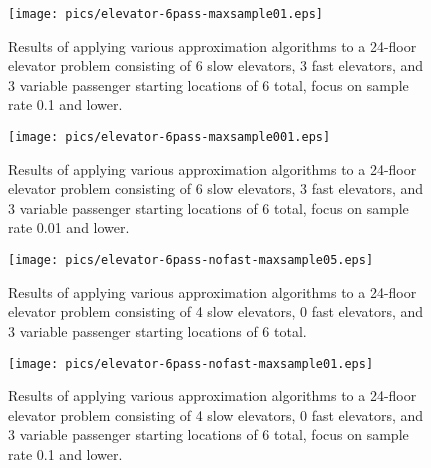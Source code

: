\begin{figure}
\begin{center}
\texttt{[image: pics/elevator-6pass-maxsample01.eps]}
\caption{Results of applying various approximation algorithms to a 24-floor elevator problem consisting of 6 slow elevators, 3 fast elevators, and 3 variable passenger starting locations of 6 total, focus on sample rate 0.1 and lower.}
\label{fig:elevator-6pass-maxsample01}
\end{center}
\end{figure}

\begin{figure}
\begin{center}
\texttt{[image: pics/elevator-6pass-maxsample001.eps]}
\caption{Results of applying various approximation algorithms to a 24-floor elevator problem consisting of 6 slow elevators, 3 fast elevators, and 3 variable passenger starting locations of 6 total, focus on sample rate 0.01 and lower.}
\label{fig:elevator-6pass-maxsample001}
\end{center}
\end{figure}






\begin{figure}
\begin{center}
\texttt{[image: pics/elevator-6pass-nofast-maxsample05.eps]}
\caption{Results of applying various approximation algorithms to a 24-floor elevator problem consisting of 4 slow elevators, 0 fast elevators, and 3 variable passenger starting locations of 6 total.}
\label{fig:elevator-6pass-nofast-maxsample05}
\end{center}
\end{figure}


\begin{figure}
\begin{center}
\texttt{[image: pics/elevator-6pass-nofast-maxsample01.eps]}
\caption{Results of applying various approximation algorithms to a 24-floor elevator problem consisting of 4 slow elevators, 0 fast elevators, and 3 variable passenger starting locations of 6 total, focus on sample rate 0.1 and lower.}
\label{fig:elevator-6pass-nofast-maxsample01}
\end{center}
\end{figure}

